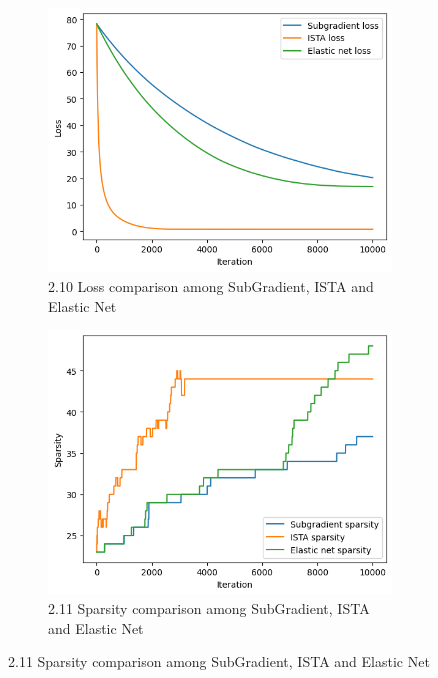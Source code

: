 \documentclass[11pt]{article}
\begin{document}
\begin{figure}[H]
\begin{subfigure}[t]{0.23\textwidth}
        \centering
        \includegraphics[width=\textwidth]{figures/fig10.png}
        \caption{2.10 Loss comparison among SubGradient, ISTA and Elastic Net}
    \end{subfigure}
    \hfill
    \begin{subfigure}[t]{0.23\textwidth}
        \centering
        \includegraphics[width=\textwidth]{figures/fig11.png}
        \caption{2.11 Sparsity comparison among SubGradient, ISTA and Elastic Net}
    \end{subfigure}

    \label{fig:four-in-a-row}
\end{figure}
\end{document}
